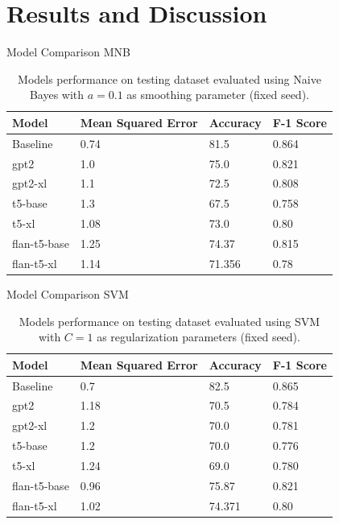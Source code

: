 \documentclass{beamer}
\begin{document}
\section{Results and Discussion}
\begin{frame}{Model Comparison MNB}

\begin{table}[h]
\centering
\begin{tabular}{llll}
\toprule
\textbf{Model} & \textbf{Mean Squared Error} & \textbf{Accuracy} & \textbf{F-1 Score} \\
\midrule
Baseline & 0.74 & 81.5 & 0.864 \\
gpt2 & 1.0 & 75.0 & 0.821 \\
gpt2-xl & 1.1 & 72.5 & 0.808 \\
t5-base & 1.3 & 67.5 & 0.758 \\
t5-xl & 1.08 & 73.0 & 0.80\\
flan-t5-base & 1.25 & 74.37 & 0.815 \\
flan-t5-xl & 1.14 & 71.356 & 0.78 \\
\bottomrule
\end{tabular}
\caption{Models performance on testing dataset evaluated using Naive Bayes with $a=0.1$ as smoothing parameter (fixed seed).}
\end{table}
\end{frame}

\begin{frame}{Model Comparison SVM}
\begin{table}[h]
\centering
\begin{tabular}{llll}
\toprule
\textbf{Model} & \textbf{Mean Squared Error} & \textbf{Accuracy} & \textbf{F-1 Score} \\
\midrule
Baseline & 0.7 & 82.5 & 0.865 \\
gpt2 & 1.18 & 70.5 & 0.784 \\
gpt2-xl & 1.2 & 70.0 & 0.781 \\
t5-base & 1.2 & 70.0 & 0.776 \\
t5-xl & 1.24 & 69.0 & 0.780\\
flan-t5-base & 0.96 & 75.87 & 0.821 \\
flan-t5-xl & 1.02 & 74.371 & 0.80 \\
\bottomrule
\end{tabular}
\caption{Models performance on testing dataset evaluated using SVM with $C=1$ as regularization parameters (fixed seed).}
\end{table}
\end{frame}
\end{document}
